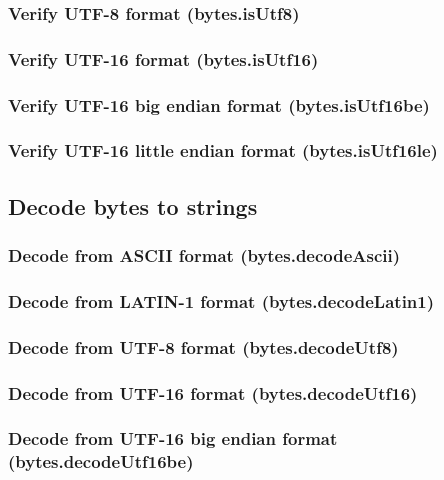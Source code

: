 \documentclass{article}
\theoremstyle{definition}
\begin{document}
\subsubsection{Verify UTF-8 format (bytes.isUtf8)}

\subsubsection{Verify UTF-16 format (bytes.isUtf16)}

\subsubsection{Verify UTF-16 big endian format (bytes.isUtf16be)}

\subsubsection{Verify UTF-16 little endian format (bytes.isUtf16le)}

\subsection{Decode bytes to strings}

\subsubsection{Decode from ASCII format (bytes.decodeAscii)}

\subsubsection{Decode from LATIN-1 format (bytes.decodeLatin1)}

\subsubsection{Decode from UTF-8 format (bytes.decodeUtf8)}

\subsubsection{Decode from UTF-16 format (bytes.decodeUtf16)}

\subsubsection{Decode from UTF-16 big endian format (bytes.decodeUtf16be)}
\end{document}
